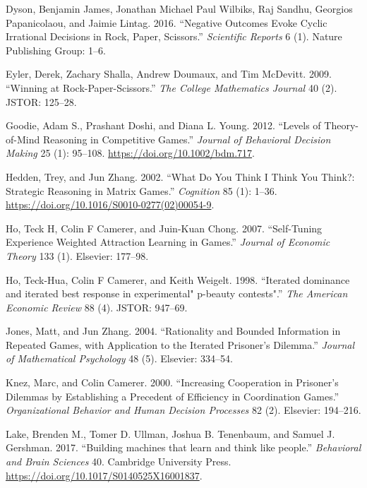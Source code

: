 \documentclass[smallextended]{svjour3}       %
\begin{document}
\leavevmode\hypertarget{ref-dyson2016negative}{}%
Dyson, Benjamin James, Jonathan Michael Paul Wilbiks, Raj Sandhu,
Georgios Papanicolaou, and Jaimie Lintag. 2016. ``Negative Outcomes
Evoke Cyclic Irrational Decisions in Rock, Paper, Scissors.''
\emph{Scientific Reports} 6 (1). Nature Publishing Group: 1--6.

\leavevmode\hypertarget{ref-eyler2009winning}{}%
Eyler, Derek, Zachary Shalla, Andrew Doumaux, and Tim McDevitt. 2009.
``Winning at Rock-Paper-Scissors.'' \emph{The College Mathematics
Journal} 40 (2). JSTOR: 125--28.

\leavevmode\hypertarget{ref-goodie_levels_2012}{}%
Goodie, Adam S., Prashant Doshi, and Diana L. Young. 2012. ``Levels of
Theory-of-Mind Reasoning in Competitive Games.'' \emph{Journal of
Behavioral Decision Making} 25 (1): 95--108.
\url{https://doi.org/10.1002/bdm.717}.

\leavevmode\hypertarget{ref-hedden_what_2002}{}%
Hedden, Trey, and Jun Zhang. 2002. ``What Do You Think I Think You
Think?: Strategic Reasoning in Matrix Games.'' \emph{Cognition} 85 (1):
1--36. \url{https://doi.org/10.1016/S0010-0277(02)00054-9}.

\leavevmode\hypertarget{ref-ho2007self}{}%
Ho, Teck H, Colin F Camerer, and Juin-Kuan Chong. 2007. ``Self-Tuning
Experience Weighted Attraction Learning in Games.'' \emph{Journal of
Economic Theory} 133 (1). Elsevier: 177--98.

\leavevmode\hypertarget{ref-ho1998iterated}{}%
Ho, Teck-Hua, Colin F Camerer, and Keith Weigelt. 1998. ``Iterated
dominance and iterated best response in experimental" p-beauty
contests".'' \emph{The American Economic Review} 88 (4). JSTOR: 947--69.

\leavevmode\hypertarget{ref-jones2004rationality}{}%
Jones, Matt, and Jun Zhang. 2004. ``Rationality and Bounded Information
in Repeated Games, with Application to the Iterated Prisoner's
Dilemma.'' \emph{Journal of Mathematical Psychology} 48 (5). Elsevier:
334--54.

\leavevmode\hypertarget{ref-knez2000increasing}{}%
Knez, Marc, and Colin Camerer. 2000. ``Increasing Cooperation in
Prisoner's Dilemmas by Establishing a Precedent of Efficiency in
Coordination Games.'' \emph{Organizational Behavior and Human Decision
Processes} 82 (2). Elsevier: 194--216.

\leavevmode\hypertarget{ref-Lake2017}{}%
Lake, Brenden M., Tomer D. Ullman, Joshua B. Tenenbaum, and Samuel J.
Gershman. 2017. ``Building machines that learn and think like people.''
\emph{Behavioral and Brain Sciences} 40. Cambridge University Press.
\url{https://doi.org/10.1017/S0140525X16001837}.
\end{document}
